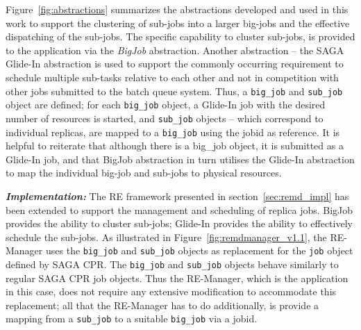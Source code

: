 \documentclass{rspublic}
\newcommand{\jhanote}[1]{ {\textcolor{red} { ***SJ: #1 }}}
\newcommand{\jhanote}[1]{}
\newcommand{\replicaagent}[1]{Replica-Agent }
\newcommand{\remanager}[1]{RE-Manager }
\begin{document}
Figure~\ref{fig:abstractions} summarizes the abstractions developed
and used in this work to support the clustering of sub-jobs into a
larger big-jobs and the effective dispatching of the sub-jobs.  The
specific capability to cluster sub-jobs, is provided to the
application via the \emph{BigJob} abstraction. 
Another abstraction -- the SAGA Glide-In abstraction is used to
support the commonly occurring requirement to schedule multiple
sub-tasks relative to each other and not in competition with other
jobs submitted to the batch queue system.  Thus, a \texttt{big\_job}
and \texttt{sub\_job} object are defined; for each \texttt{big\_job}
object, a Glide-In job with the desired number of resources is
started, and \texttt{sub\_job} objects -- which correspond to
individual replicas, are mapped to a \texttt{big\_job} using the jobid
as reference. It is helpful to reiterate that although there is a
big\_job object, it is submitted as a Glide-In job, and that BigJob
abstraction in turn utilises the Glide-In abstraction to map the
individual big-job and sub-jobs to physical resources.

    
{\noindent \it \bf Implementation:} The RE framework presented in section~\ref{sec:remd_impl} has been
extended to support the management and scheduling of replica jobs.
BigJob provides the ability to cluster sub-jobs; Glide-In provides the
ability to effectively schedule the sub-jobs.  As illustrated in
Figure~\ref{fig:remdmanager_v1.1}, the RE-Manager uses the
\texttt{big\_job} and \texttt{sub\_job} objects as replacement for the
\texttt{job} object defined by SAGA CPR.  The \texttt{big\_job} and
\texttt{sub\_job} objects behave similarly to regular SAGA CPR job
objects. Thus the RE-Manager, which is the application in this case,
does not require any extensive modification to accommodate this
replacement; all that the RE-Manager has to do additionally, is
provide a mapping from a \texttt{sub\_job} to a suitable
\texttt{big\_job} via a jobid.
\end{document}
